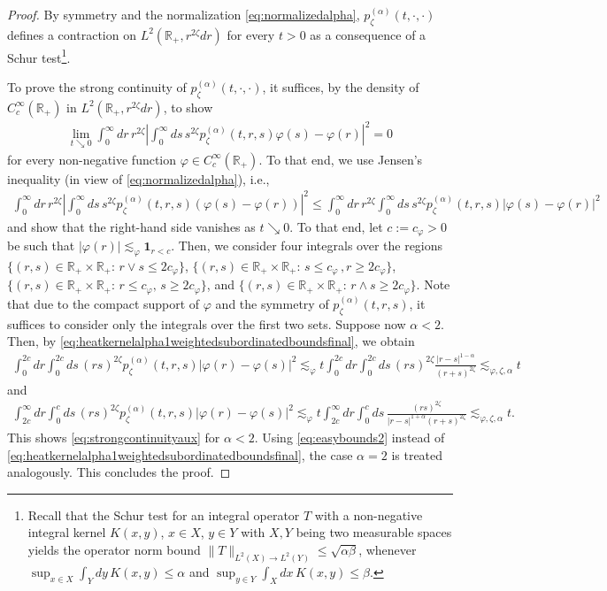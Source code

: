 \documentclass[10pt,a4paper]{amsart}
\newcommand{\R}{\mathbb{R}}
\newcommand{\one}{\mathbf{1}}
\renewcommand{\phi}{\varphi}
\begin{document}
\begin{proof}
  By symmetry and the normalization \eqref{eq:normalizedalpha}, $p_\zeta^{(\alpha)}(t,\cdot,\cdot)$ defines a contraction on $L^2(\R_+,r^{2\zeta}dr)$ for every $t>0$ as a consequence of a Schur test\footnote{Recall that the Schur test for an integral operator $T$ with a non-negative integral kernel $K(x,y)$, $x\in X$, $y\in Y$ with $X,Y$ being two measurable spaces yields the operator norm bound $\|T\|_{L^2(X)\to L^2(Y)}\leq\sqrt{\alpha\beta}$, whenever $\sup_{x\in X}\int_Y dy\, K(x,y)\leq\alpha$ and $\sup_{y\in Y}\int_X dx\, K(x,y)\leq\beta$.}.
  
  To prove the strong continuity of $p_{\zeta}^{(\alpha)}(t,\cdot,\cdot)$, it suffices, by the density of $C_c^\infty(\R_+)$ in $L^2(\R_+,r^{2\zeta}dr)$, to show
  \begin{align}
    \label{eq:strongcontinuityaux}
    \lim_{t\searrow0} \int_0^\infty dr\, r^{2\zeta} \left|\int_0^\infty ds\, s^{2\zeta} p_\zeta^{(\alpha)}(t,r,s)\phi(s) - \phi(r)\right|^2 = 0
  \end{align}
  for every non-negative function $\phi\in C_c^\infty(\R_+)$.
  To that end, we use Jensen's inequality (in view of \eqref{eq:normalizedalpha}), i.e.,
  \begin{align*}
    \int_0^\infty dr\, r^{2\zeta}\left|\int_0^\infty ds\, s^{2\zeta} p_\zeta^{(\alpha)}(t,r,s)(\phi(s)-\phi(r))\right|^2
    \leq \int_0^\infty dr\, r^{2\zeta} \int_0^\infty ds\, s^{2\zeta}p_\zeta^{(\alpha)}(t,r,s)|\phi(s)-\phi(r)|^2
  \end{align*}
  and show that the right-hand side vanishes as $t\searrow0$.
  To that end, let $c:=c_\phi>0$ be such that $|\phi(r)|\lesssim_\phi\one_{r<c}$. Then, we consider four integrals over the regions
  $\{(r,s)\in\R_+\times\R_+:\, r\vee s\leq 2c_\phi\}$,
  $\{(r,s)\in\R_+\times\R_+:\, s\leq c_\phi\,, r\geq 2c_\phi\}$,
  $\{(r,s)\in\R_+\times\R_+:\, r\leq c_\phi,\, s\geq 2c_\phi\}$, and
  $\{(r,s)\in\R_+\times\R_+:\, r\wedge s\geq 2c_\phi\}$.
  Note that due to the compact support of $\phi$ and the symmetry of $p_\zeta^{(\alpha)}(t,r,s)$, it suffices to consider only the integrals over the first two sets. Suppose now $\alpha<2$. Then, by \eqref{eq:heatkernelalpha1weightedsubordinatedboundsfinal}, we obtain
  \begin{align*}
    \int_0^{2c} dr \int_0^{2c} ds\, (rs)^{2\zeta}p_\zeta^{(\alpha)}(t,r,s)|\phi(r)-\phi(s)|^2
    \lesssim_\phi t\int_0^{2c} dr \int_0^{2c} ds\, (rs)^{2\zeta} \frac{|r-s|^{1-\alpha}}{(r+s)^{2\zeta}}
    \lesssim_{\phi,\zeta,\alpha} t
  \end{align*}
  and
  \begin{align*}
    \int_{2c}^\infty dr \int_0^c ds\, (rs)^{2\zeta}p_\zeta^{(\alpha)}(t,r,s)|\phi(r)-\phi(s)|^2
    \lesssim_\phi t\int_{2c}^\infty dr \int_0^c ds\, \frac{(rs)^{2\zeta}}{|r-s|^{1+\alpha}(r+s)^{2\zeta}}
    \lesssim_{\phi,\zeta,\alpha}t.
  \end{align*}
  This shows \eqref{eq:strongcontinuityaux} for $\alpha<2$.
  Using \eqref{eq:easybounds2} instead of \eqref{eq:heatkernelalpha1weightedsubordinatedboundsfinal}, the case $\alpha=2$ is treated analogously.
  This concludes the proof.
\end{proof}
\end{document}
